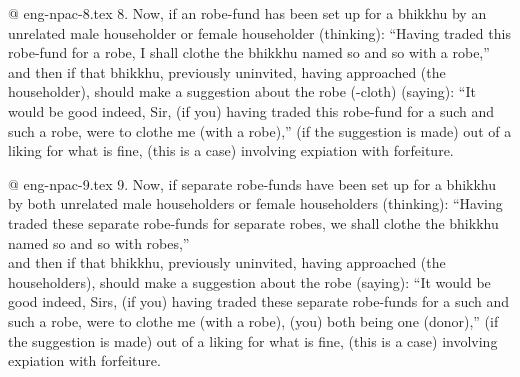 @ eng-npac-8.tex
8. Now, if an robe-fund has been set up for a bhikkhu by an unrelated male householder or female householder (thinking): “Having traded this robe-fund for a robe, I shall clothe the bhikkhu named so and so with a robe,”\\
and then if that bhikkhu, previously uninvited, having approached (the householder), should make a suggestion about the robe (-cloth) (saying): “It would be good indeed, Sir, (if you) having traded this robe-fund for a such and such a robe, were to clothe me (with a robe),” (if the suggestion is made) out of a liking for what is fine, (this is a case) involving expiation with forfeiture.

@ eng-npac-9.tex
9. Now, if separate robe-funds have been set up for a bhikkhu by both unrelated male householders or female householders (thinking): “Having traded these separate robe-funds for separate robes, we shall clothe the bhikkhu named so and so with robes,”\\
and then if that bhikkhu, previously uninvited, having approached (the householders), should make a suggestion about the robe (saying): “It would be good indeed, Sirs, (if you) having traded these separate robe-funds for a such and such a robe, were to clothe me (with a robe), (you) both being one (donor),” (if the suggestion is made) out of a liking for what is fine, (this is a case) involving expiation with forfeiture.

